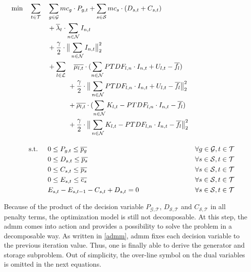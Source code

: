 \begin{subequations}
	\begin{align}
		 \min \quad \sum_{t\in\mathcal{T}} \quad & \sum_{g\in\mathcal{G}}mc_g \cdot P_{g,t} + \sum_{s\in\mathcal{S}}mc_s \cdot (D_{s,t}+C_{s,t}) \label{eq:dom:final} \\
		 & + \overline{\lambda}_t \cdot \sum_{n \in \mathcal{N}} I_{n,t} \nonumber \\
		 & + \frac{\gamma}{2} \cdot \big\|\sum_{n \in \mathcal{N}} I_{n,t}\big\|^2_2 \nonumber \\
		 & +  \sum_{l \in \mathcal{L}} \quad \overline{\mu_{l,t}} \cdot (\sum_{n \in \mathcal{N}} PTDF_{l,n} \cdot I_{n,t} + U_{l,t} - \overline{f_l}) \nonumber \\
		 & \quad \qquad + \frac{\gamma}{2} \cdot \big\| \sum_{n \in \mathcal{N}} PTDF_{l,n} \cdot I_{n,t} + U_{l,t} - \overline{f_l} \big\|^2_2 \nonumber \\
		 & \quad \qquad + \overline{\rho_{l,t}} \cdot (\sum_{n \in \mathcal{N}} K_{l,t} - PTDF_{l,n} \cdot I_{n,t} - \overline{f_l}) \nonumber \\
		 & \quad \qquad + \frac{\gamma}{2} \cdot \big\|\sum_{n \in \mathcal{N}} K_{l,t} - PTDF_{l,n} \cdot I_{n,t} - \overline{f_l} \big\|^2_2 \nonumber \\[10pt]
		 \text{s.t. } \quad & 0 \leq P_{g,t} \leq \overline{p_g} && \forall g \in \mathcal{G}, t \in \mathcal{T}\\
		 & 0 \leq D_{s,t} \leq \overline{p_s} && \forall s \in \mathcal{S}, t \in \mathcal{T} \\
		 & 0 \leq C_{s,t} \leq \overline{p_s} && \forall s \in \mathcal{S}, t \in \mathcal{T} \\
		 & 0 \leq E_{s,t} \leq \overline{e_s} && \forall s \in \mathcal{S}, t \in \mathcal{T} \\
		 & E_{s,t} - E_{s,t-1} - C_{s,t} + D_{s,t} = 0 && \forall s \in \mathcal{S}, t \in \mathcal{T}
	\end{align}
\end{subequations}

Because of the product of the decision variable $P_{\mathcal{G},\mathcal{T}}$, $D_{\mathcal{S},\mathcal{T}}$ and $C_{\mathcal{S},\mathcal{T}}$ in all penalty terms, the optimization model is still not decomposable. At this step, the \gls{admm} comes into action and provides a possibility to solve the problem in a decomposable way. As written in \ref{admm}, \gls{admm} fixes each decision variable to the previous iteration value. Thus, one is finally able to derive the generator and storage subproblem. Out of simplicity, the over-line symbol on the dual variables is omitted in the next equations.


